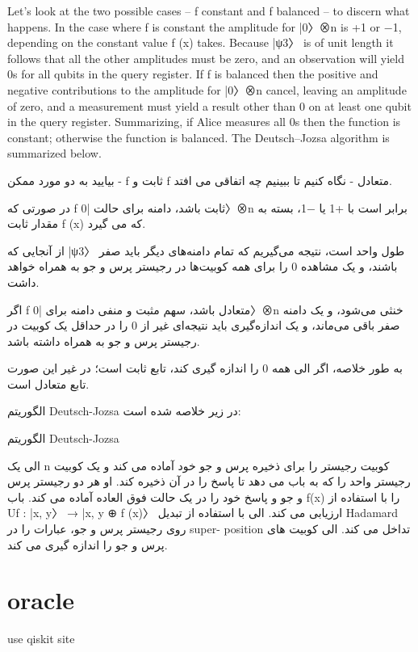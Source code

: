 \documentclass{book}
\begin{document}
	Let’s look at the two possible cases – f constant and f balanced – to
	discern what happens. In the case where f is constant the amplitude for |0〉⊗n is +1 or
	−1, depending on the constant value f (x) takes. Because |ψ3〉 is of unit length it follows
	that all the other amplitudes must be zero, and an observation will yield 0s for all qubits
	in the query register. If f is balanced then the positive and negative contributions to the
	amplitude for |0〉⊗n cancel, leaving an amplitude of zero, and a measurement must yield
	a result other than 0 on at least one qubit in the query register. Summarizing, if Alice measures all 0s then the function is constant; otherwise the function is balanced. The
	Deutsch–Jozsa algorithm is summarized below.
	
	
	بیایید به دو مورد ممکن - f ثابت و f متعادل - نگاه کنیم تا ببینیم چه اتفاقی می افتد.
	
	در صورتی که f ثابت باشد، دامنه برای حالت |0〉⊗n برابر است با +1 یا
	−1، بسته به مقدار ثابت f (x) که می گیرد.
	
	از آنجایی که |ψ3〉 طول واحد است، نتیجه می‌گیریم که تمام دامنه‌های دیگر باید صفر باشند، و یک مشاهده 0 را برای همه کوبیت‌ها در رجیستر پرس و جو به همراه خواهد داشت.
	
	اگر f متعادل باشد، سهم مثبت و منفی دامنه برای |0〉⊗n خنثی می‌شود، و یک دامنه صفر باقی می‌ماند، و یک اندازه‌گیری باید نتیجه‌ای غیر از 0 را در حداقل یک کوبیت در رجیستر پرس و جو به همراه داشته باشد.
	
	به طور خلاصه، اگر الی همه 0 را اندازه گیری کند، تابع ثابت است؛ در غیر این صورت تابع متعادل است.
	
	الگوریتم Deutsch-Jozsa در زیر خلاصه شده است:
	
	الگوریتم Deutsch-Jozsa
	
	الی یک n کوبیت رجیستر را برای ذخیره پرس و جو خود آماده می کند و یک کوبیت رجیستر واحد را که به باب می دهد تا پاسخ را در آن ذخیره کند.
	او هر دو رجیستر پرس و جو و پاسخ خود را در یک حالت فوق العاده آماده می کند.
	باب f(x) را با استفاده از Uf : |x, y〉 → |x, y ⊕ f (x)〉 ارزیابی می کند.
	الی با استفاده از تبدیل Hadamard روی رجیستر پرس و جو، عبارات را در super- position تداخل می کند.
	الی کوبیت های پرس و جو را اندازه گیری می کند.
	
	
	
	
	
\section{oracle}
use qiskit site
\end{document}

